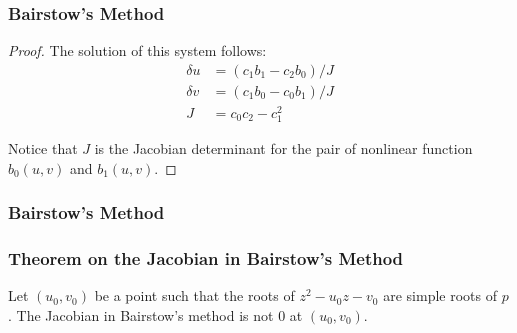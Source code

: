 \documentclass[notheorems,mathserif,table,compress]{beamer}  %
\begin{document}
\begin{frame}
\frametitle{Bairstow's Method}
\begin{proof}
The solution of this system follows:
\begin{equation*}
\begin{split}
\delta u&=(c_1 b_1-c_2 b_0)/J\\
\delta v&=(c_1 b_0-c_0 b_1)/J\\
J&=c_0 c_2-c_1^2
\end{split}
\end{equation*}

Notice that $J$ is the Jacobian determinant for the pair of nonlinear function $b_0(u,v)$ and $b_1(u,v)$.
\end{proof}
\end{frame}

\begin{frame}
\frametitle{Bairstow's Method}

\end{frame}

\begin{frame}
\frametitle{Theorem on the Jacobian in Bairstow's Method}
\begin{theorem}
Let $(u_0,v_0)$ be a point such that the roots of $z^2-u_0z-v_0$ are simple roots of $p$. The Jacobian in Bairstow's method is not 0 at $(u_0,v_0)$. 
\end{theorem}
\end{frame}
\end{document}
